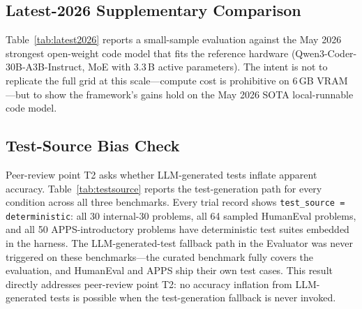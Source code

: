 \documentclass[journal]{IEEEtran}
\begin{document}
\begin{table}[!ht]
\caption{Error-class distribution among failed trials (\%) on internal-30.}
\label{tab:errortax}
\centering

\end{table}

\FloatBarrier
\subsection{Latest-2026 Supplementary Comparison}
Table~\ref{tab:latest2026} reports a small-sample evaluation against the May 2026 strongest open-weight code model that fits the reference hardware (Qwen3-Coder-30B-A3B-Instruct, MoE with 3.3\,B active parameters). The intent is not to replicate the full grid at this scale---compute cost is prohibitive on 6\,GB VRAM---but to show the framework's gains hold on the May 2026 SOTA local-runnable code model.

\begin{table}[!ht]
\caption{Supplementary: Qwen3-Coder-30B-A3B on a 10-problem stratified subset of internal-30 (1 trial). Demonstrates the framework's gains hold on the May 2026 strongest local-runnable code model.}
\label{tab:latest2026}
\centering

\end{table}

\subsection{Test-Source Bias Check}%
Peer-review point T2 asks whether LLM-generated tests inflate apparent accuracy. Table~\ref{tab:testsource} reports the test-generation path for every condition across all three benchmarks. Every trial record shows \texttt{test\_source = deterministic}: all 30 internal-30 problems, all 64 sampled HumanEval problems, and all 50 APPS-introductory problems have deterministic test suites embedded in the harness. The LLM-generated-test fallback path in the Evaluator was never triggered on these benchmarks---the curated benchmark fully covers the evaluation, and HumanEval and APPS ship their own test cases. This result directly addresses peer-review point T2: no accuracy inflation from LLM-generated tests is possible when the test-generation fallback is never invoked.

\begin{table}[!ht]
\caption{Pass-rate split by test source across all benchmarks and conditions. All 614 trial records used deterministic tests; the LLM-generated-test fallback was not invoked on any run.}
\label{tab:testsource}
\centering

\end{table}
\end{document}
